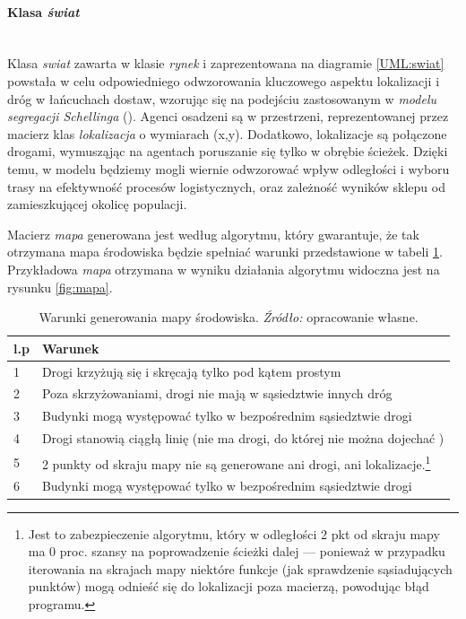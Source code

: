 \documentclass[polish, twoside, 12pt, a4paper]{article}
\theoremstyle{definition}
\theoremstyle{plain}
\theoremstyle{remark}
\begin{document}
\paragraph{Klasa \textit{świat}}\mbox{}\\

Klasa \textit{swiat} zawarta w klasie \textit{rynek} i zaprezentowana na diagramie \ref{UML:swiat} powstała w celu odpowiedniego odwzorowania kluczowego aspektu lokalizacji i dróg w łańcuchach dostaw, wzorując się na podejściu zastosowanym w \textit{modelu segregacji Schellinga} (\cite{Schelling1971}). Agenci osadzeni są w przestrzeni, reprezentowanej przez macierz klas \textit{lokalizacja} o wymiarach (x,y). Dodatkowo, lokalizacje są połączone drogami, wymusząjąc na agentach poruszanie się tylko w obrębie ścieżek. Dzięki temu, w modelu będziemy mogli wiernie odwzorować wpływ odległości i wyboru trasy na efektywność procesów logistycznych, oraz zależność wyników sklepu od zamieszkującej okolicę populacji. 

Macierz \textit{mapa} generowana jest według algorytmu, który gwarantuje, że tak otrzymana mapa środowiska będzie spełniać warunki przedstawione w tabeli \ref{tab:warunki_drogi}. Przykładowa \textit{mapa} otrzymana w wyniku działania algorytmu widoczna jest na rysunku \ref{fig:mapa}.

\begin{table}[hbt]
  \centering
  \captionsetup{margin=10pt,font=small,labelfont=bf,width=.8\textwidth}
  \caption[Warunki generowania mapy środowiska]{Warunki generowania mapy środowiska. \textit{Źródło:} opracowanie własne.}
  \label{tab:warunki_drogi}
\vspace*{2ex}
  \begin{tabular}{ll}
    l.p        & Warunek  \\ \hline
    1     &   Drogi krzyżują się i skręcają tylko pod kątem prostym  \\
    2        &    Poza skrzyżowaniami, drogi nie mają w sąsiedztwie innych dróg     \\
    3 &   Budynki mogą występować tylko w bezpośrednim sąsiedztwie drogi \\ 
    4 &   Drogi stanowią ciągłą linię (nie ma drogi, do której nie można dojechać ) \\ 
    5 &   2 punkty od skraju mapy nie są generowane ani drogi, ani lokalizacje.\footnote{Jest to zabezpieczenie algorytmu, który w odległości 2 pkt od skraju mapy ma 0 proc. szansy na poprowadzenie ścieżki dalej --- ponieważ w przypadku iterowania na skrajach mapy niektóre funkcje (jak sprawdzenie sąsiadujących punktów) mogą odnieść się do lokalizacji poza macierzą, powodując błąd programu.}\\ 
    6 &   Budynki mogą występować tylko w bezpośrednim sąsiedztwie drogi \\   \hline
  \end{tabular}
\end{table}
\end{document}
